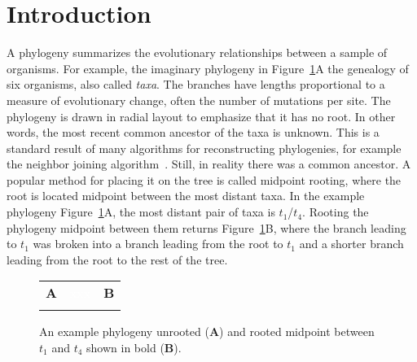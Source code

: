 \nwfilename{}\nwenddocs{}\nwdocspar%
\section{Introduction}
A phylogeny summarizes the evolutionary relationships between a sample
of organisms. For example, the imaginary phylogeny in
Figure~\ref{fig:phy}A the genealogy of six organisms, also called
\emph{taxa}. The branches have lengths proportional to a measure of
evolutionary change, often the number of mutations per site. The
phylogeny is drawn in radial layout to emphasize that it has no
root. In other words, the most recent common ancestor of the taxa is
unknown. This is a standard result of many algorithms for
reconstructing phylogenies, for example the neighbor joining
algorithm~\cite{sai87:nei}. Still, in reality there was a common
ancestor. A popular method for placing it on the tree is called
midpoint rooting, where the root is located midpoint between the most
distant taxa. In the example phylogeny Figure~\ref{fig:phy}A, the most distant pair of taxa
is $t_1$/$t_4$. Rooting the phylogeny midpoint between them
returns Figure~\ref{fig:phy}B, where the branch leading to $t_1$ was
broken into a branch leading from the root to $t_1$ and a shorter branch
leading from the root to the rest of the tree.

\begin{figure}
  \begin{center}
    \begin{tabular}{ccc}
        \textbf{A} & \textcolor{white}{xxx}& \textbf{B}\\
         & & 
    \end{tabular}
  \end{center}
  \caption{An example phylogeny unrooted (\textbf{A}) and rooted
    midpoint between $t_1$ and $t_4$ shown in bold (\textbf{B}).}\label{fig:phy}
\end{figure}

